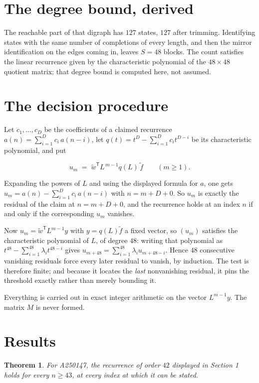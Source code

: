 \documentclass[11pt]{article}
\newtheorem{theorem}{Theorem}
\theoremstyle{definition}
\begin{document}
\section{The degree bound, derived}

The reachable part of that digraph has $127$ states, $127$ after trimming. Identifying states with the same number of completions of every length, and then the mirror identification on the edges coming in, leaves $S = 48$ blocks. The count satisfies the linear recurrence given by the characteristic polynomial of the $48\times48$ quotient matrix; that degree bound is computed here, not assumed.

\section{The decision procedure}

Let $c_1,\dots,c_D$ be the coefficients of a claimed recurrence $a(n) = \sum_{i=1}^{D} c_i\,a(n-i)$, let $q(t) = t^{D} - \sum_{i=1}^{D} c_i t^{D-i}$ be its characteristic polynomial, and put

\[u_m \;=\; \tilde w^{\mathsf T} L^{\,m-1} q(L)\,\tilde f \qquad (m \ge 1).\]

Expanding the powers of $L$ and using the displayed formula for $a$, one gets $u_m = a(n) - \sum_{i=1}^{D} c_i\,a(n-i)$ with $n = m + D + 0$. So $u_m$ is exactly the residual of the claim at $n = m + D + 0$, and the recurrence holds at an index $n$ if and only if the corresponding $u_m$ vanishes.

Now $u_m = \tilde w^{\mathsf T} L^{m-1} y$ with $y = q(L)\tilde f$ a fixed vector, so $(u_m)$ satisfies the characteristic polynomial of $L$, of degree $48$: writing that polynomial as $t^{48} - \sum_{i=1}^{48} \lambda_i t^{48-i}$ gives $u_{m+48} = \sum_{i=1}^{48} \lambda_i u_{m+48-i}$. Hence $48$ consecutive vanishing residuals force every later residual to vanish, by induction. The test is therefore finite; and because it locates the {\itshape last} nonvanishing residual, it pins the threshold exactly rather than merely bounding it.

Everything is carried out in exact integer arithmetic on the vector $L^{m-1}y$. The matrix $M$ is never formed.

\section{Results}

\begin{theorem} For A250147, the recurrence of order $42$ displayed in Section 1 holds for every $n \ge 43$, at every index at which it can be stated.\end{theorem}
\end{document}
